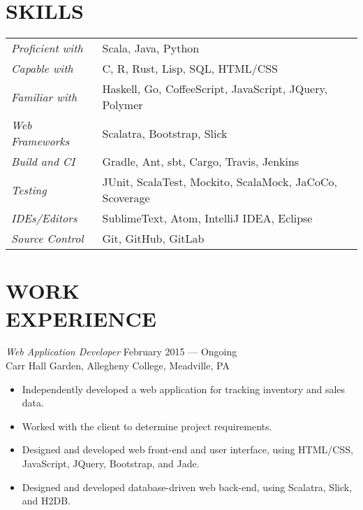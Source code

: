 \documentclass[margin]{res}
\begin{document}
\begin{resume}
\section{SKILLS}
   \begin{tabular}{l p{3in}}
                \textit{Proficient with} & Scala, Java, Python \\
                \textit{Capable with} & C, R, Rust, Lisp, SQL, HTML/CSS \\
                \textit{Familiar with} & Haskell, Go, CoffeeScript, JavaScript, JQuery, Polymer \\
                \textit{Web Frameworks}  & Scalatra, Bootstrap, Slick \\
                \textit{Build and CI}  & Gradle, Ant, sbt, Cargo, Travis, Jenkins \\
                \textit{Testing}  & JUnit, ScalaTest, Mockito, ScalaMock, JaCoCo, Scoverage \\
                \textit{IDEs/Editors}  & SublimeText, Atom, IntelliJ IDEA, Eclipse \\
                \textit{Source Control} &Git, GitHub, GitLab
 \end{tabular}


\section{WORK \\ EXPERIENCE} 

        {\sl Web Application Developer} \hfill  February 2015 --- Ongoing \\
                Carr Hall Garden, Allegheny College, Meadville, PA
                 \begin{itemize}  \itemsep -2pt %
                    \item Independently developed a web application for tracking inventory and sales data.
                    \item Worked with the client to determine project requirements.
                    \item Designed and developed web front-end and user interface, using HTML/CSS, JavaScript, JQuery, Bootstrap, and Jade.
                    \item Designed and developed database-driven web back-end, using Scalatra, Slick, and H2DB. 
                 \end{itemize}


\end{resume}
\end{document}
